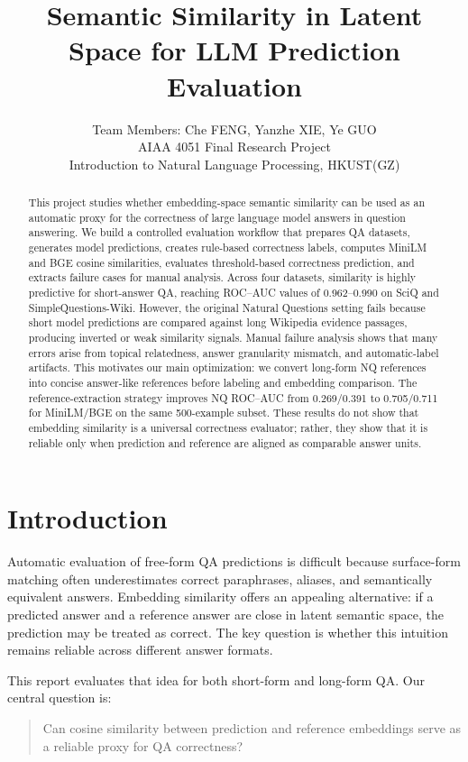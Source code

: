 \documentclass[11pt]{article}
\title{Semantic Similarity in Latent Space for LLM Prediction Evaluation}
\author{
  Team Members: Che FENG, Yanzhe XIE, Ye GUO \\
  AIAA 4051 Final Research Project \\
  Introduction to Natural Language Processing, HKUST(GZ) \\
}
\begin{document}
\maketitle

\begin{abstract}
This project studies whether embedding-space semantic similarity can be used as an automatic proxy for the correctness of large language model answers in question answering. We build a controlled evaluation workflow that prepares QA datasets, generates model predictions, creates rule-based correctness labels, computes MiniLM and BGE cosine similarities, evaluates threshold-based correctness prediction, and extracts failure cases for manual analysis. Across four datasets, similarity is highly predictive for short-answer QA, reaching ROC--AUC values of 0.962--0.990 on SciQ and SimpleQuestions-Wiki. However, the original Natural Questions setting fails because short model predictions are compared against long Wikipedia evidence passages, producing inverted or weak similarity signals. Manual failure analysis shows that many errors arise from topical relatedness, answer granularity mismatch, and automatic-label artifacts. This motivates our main optimization: we convert long-form NQ references into concise answer-like references before labeling and embedding comparison. The reference-extraction strategy improves NQ ROC--AUC from 0.269/0.391 to 0.705/0.711 for MiniLM/BGE on the same 500-example subset. These results do not show that embedding similarity is a universal correctness evaluator; rather, they show that it is reliable only when prediction and reference are aligned as comparable answer units.
\end{abstract}

\section{Introduction}

Automatic evaluation of free-form QA predictions is difficult because surface-form matching often underestimates correct paraphrases, aliases, and semantically equivalent answers. Embedding similarity offers an appealing alternative: if a predicted answer and a reference answer are close in latent semantic space, the prediction may be treated as correct. The key question is whether this intuition remains reliable across different answer formats.

This report evaluates that idea for both short-form and long-form QA. Our central question is:
\begin{quote}
Can cosine similarity between prediction and reference embeddings serve as a reliable proxy for QA correctness?
\end{quote}
\end{document}
